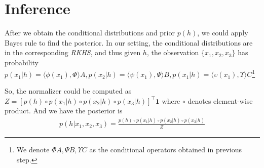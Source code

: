 \documentclass[11pt]{article}
\newcommand{\trans}{\top}
\newcommand{\bm}{\mathbf}
\begin{document}
\section{Inference}
After we obtain the conditional distributions and prior $p(h)$, we could apply Bayes rule to find the posterior. In our setting, the conditional distributions are in the corresponding \emph{RKHS}, and thus given $h$, the observation $\{x_1,x_2,x_3\}$ has probability $p(x_1|h) = \langle\phi(x_1), \Phi \rangle A, p(x_2|h) = \langle\psi(x_1), \Psi \rangle B, p(x_1|h) = \langle\upsilon(x_1), \Upsilon \rangle C$\footnote{We denote $\Phi A, \Psi B, \Upsilon C$ as the conditional operators obtained in previous step.}

So, the normalizer could be computed as $Z = [p(h)\circ p(x_1|h)\circ p(x_2|h)\circ p(x_3|h)]^\trans\bm{1}$ where $\circ$ denotes element-wise product. And we have the posterior is
%
\begin{eqnarray*}
p(h|x_1, x_2, x_3) = \frac{p(h)\circ p(x_1|h)\circ p(x_2|h)\circ p(x_3|h)}{Z}
\end{eqnarray*}
%



\end{document}
